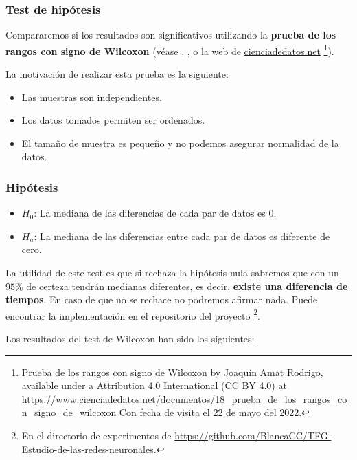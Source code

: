 \subsubsection{Test de hipótesis}

Compararemos si los resultados son significativos utilizando la \textbf{prueba de los rangos con 
signo de Wilcoxon} (véase \cite{OpenIntroStatistics}, \cite{BiologicalStatistics}, o la web de \href{https://www.cienciadedatos.net}{cienciadedatos.net} \footnote{
 Prueba de los rangos con signo de Wilcoxon by Joaquín Amat Rodrigo, available under a Attribution 4.0 International (CC BY 4.0) at
  \url{https://www.cienciadedatos.net/documentos/18_prueba_de_los_rangos_con_signo_de_wilcoxon}
  Con fecha de visita el 22 de mayo del 2022.
  }).

  La motivación de realizar esta prueba es la siguiente: 
\begin{itemize}
    \item Las muestras son independientes.
    \item Los datos tomados permiten ser ordenados. 
    \item El tamaño de muestra es pequeño y no podemos asegurar normalidad de la datos. 
\end{itemize}

\subsubsection*{Hipótesis} 

\begin{itemize}
    \item $H_0$: La mediana de las diferencias de cada par de datos es $0$. 
    \item $H_a$: La mediana de las diferencias entre cada par de datos es diferente de cero. 
\end{itemize}

La utilidad de este test es que si rechaza la hipótesis nula sabremos que con un $95 \%$ de certeza tendrán medianas diferentes, es decir, \textbf{existe una 
diferencia de tiempos}. En caso de que no se rechace no podremos afirmar nada.
Puede encontrar la implementación en el repositorio del
 proyecto \footnote{En el directorio de experimentos 
 de \url{https://github.com/BlancaCC/TFG-Estudio-de-las-redes-neuronales}.}.

 Los resultados del test de Wilcoxon han sido los siguientes: 

